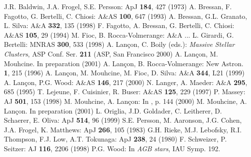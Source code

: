 \documentclass[runningheads]{svmult}
\begin{document}
\begin{thebibliography}{10.}

 J.R. Baldwin, J.A. Frogel, S.E. Persson: ApJ {\bf 184}, 427
 (1973)
 A. Bressan, F. Fagotto, G. Bertelli, C. Chiosi: A\&AS
 {\bf 100}, 647 (1993)
 A. Bressan, G.L. Granato, L. Silva: A\&A {\bf 332}, 135 (1998)
 F. Fagotto, A. Bressan, G. Bertelli, C. Chiosi:
 A\&AS {\bf 105}, 29 (1994)
 M. Fioc, B. Rocca-Volmerange: A\&A ...
 L. Girardi, G. Bertelli: MNRAS {\bf 300}, 533 (1998)
 A. Lan\c{c}on, C. Boily (eds.): \emph{Massive
 Stellar Clusters}, ASP Conf. Ser. {\bf 211} (ASP, San Francisco 2000)
 A. Lan\c{c}on, M. Mouhcine. In preparation (2001)
 A. Lan\c{c}on, B. Rocca-Volmerange: New Astron. {\bf 1},
 215 (1996)
 A. Lan\c{c}on, M. Mouhcine, M. Fioc, D. Silva: A\&A {\bf 344},
 L21 (1999)
 A. Lan\c{c}on, P.G. Wood: A\&AS {\bf 146}, 217 (2000)
 N. Langer, A. Maeder: A\&A {\bf 295}, 685 (1995)
 T. Lejeune, F. Cuisinier, R. Buser: A\&AS {\bf 125}, 229 (1997)
 P. Massey: AJ {\bf 501}, 153 (1998)
 M. Mouhcine, A. Lan\c{c}on: In \cite{Strasbourg00}, p. 144 (2000)
 M. Mouhcine, A. Lan\c{c}on. In preparation (2001)
 L. Origlia, J.D. Goldader, C. Leitherer, D. Schaerer,
 E. Oliva: ApJ {\bf 514}, 96 (1999)
 S.E. Persson, M. Aaronson, J.G. Cohen, J.A. Frogel,
 K. Matthews: ApJ {\bf 266}, 105 (1983)
 G.H. Rieke, M.J. Lebofsky, R.I. Thompson, F.J. Low,
 A.T. Tokunaga: ApJ {\bf 238}, 24 (1980)
 F. Schweizer, P. Seitzer: AJ {\bf 116}, 2206 (1998)
 P.G. Wood: In {\em AGB stars}, IAU Symp. 192.

\end{thebibliography}
\end{document}
